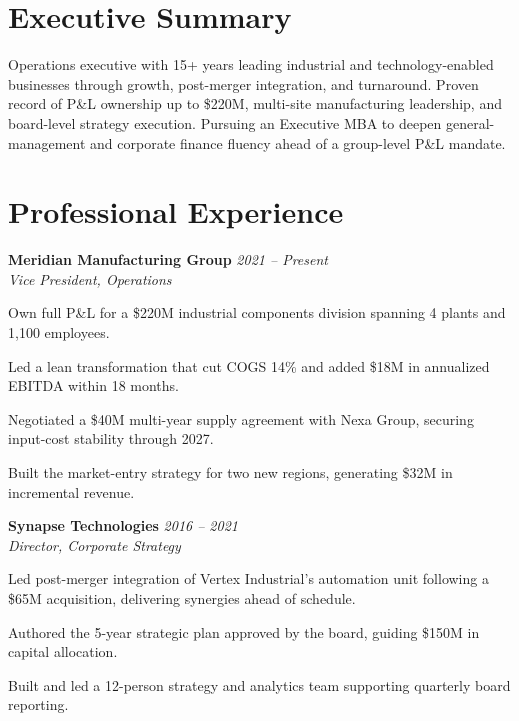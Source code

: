 \documentclass[10pt]{article}
\newcommand{\role}[3]{%
  \noindent\textbf{\color{navy}#1} \hfill {\small\color{slate}\textit{#3}}\\
  \textit{\color{slate}#2}\par\vspace{2pt}%
}
\begin{document}
\hspace{0.03\textwidth}%
\begin{minipage}[t]{0.655\textwidth}

\section*{Executive Summary}
{\small
Operations executive with 15+ years leading industrial and technology-enabled businesses through growth, post-merger integration, and turnaround. Proven record of P\&L ownership up to \$220M, multi-site manufacturing leadership, and board-level strategy execution. Pursuing an Executive MBA to deepen general-management and corporate finance fluency ahead of a group-level P\&L mandate.
}

\vspace{10pt}

\section*{Professional Experience}

\role{Meridian Manufacturing Group}{Vice President, Operations}{2021 -- Present}
\begin{cvitems}
\item Own full P\&L for a \$220M industrial components division spanning 4 plants and 1{,}100 employees.
\item Led a lean transformation that cut COGS 14\% and added \$18M in annualized EBITDA within 18 months.
\item Negotiated a \$40M multi-year supply agreement with Nexa Group, securing input-cost stability through 2027.
\item Built the market-entry strategy for two new regions, generating \$32M in incremental revenue.
\end{cvitems}

\vspace{9pt}
\role{Synapse Technologies}{Director, Corporate Strategy}{2016 -- 2021}
\begin{cvitems}
\item Led post-merger integration of Vertex Industrial's automation unit following a \$65M acquisition, delivering synergies ahead of schedule.
\item Authored the 5-year strategic plan approved by the board, guiding \$150M in capital allocation.
\item Built and led a 12-person strategy and analytics team supporting quarterly board reporting.
\end{cvitems}


\end{minipage}
\end{document}
